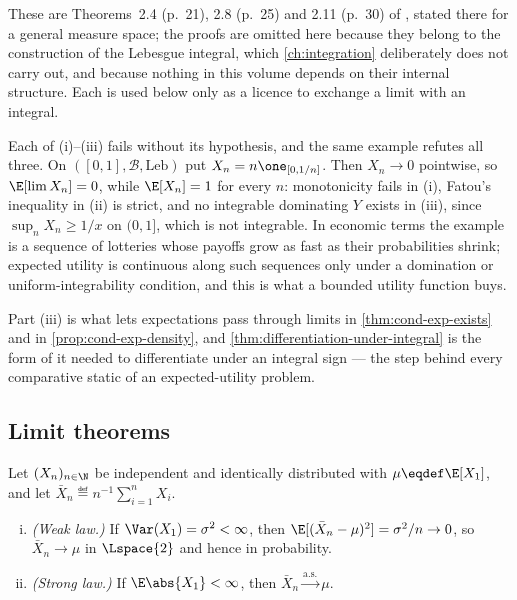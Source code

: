 These are Theorems~2.4 (p.~21), 2.8 (p.~25) and 2.11 (p.~30) of
\textcite{legall2022measure}, stated there for a general measure space; the proofs
are omitted here because they belong to the construction of the Lebesgue
integral, which \autoref{ch:integration} deliberately does not carry out, and
because nothing in this volume depends on their internal structure. Each is used
below only as a licence to exchange a limit with an integral.

\begin{remark}\label{rem:convergence-hypotheses}
	Each of (i)--(iii) fails without its hypothesis, and the same example refutes
	all three. On $([0,1],\mathcal{B},\text{Leb})$ put $X_n=n\one_{[0,1/n]}$. Then
	$X_n\to0$ pointwise, so $\E[\lim X_n]=0$, while $\E[X_n]=1$ for every $n$:
	monotonicity fails in (i), Fatou's inequality in (ii) is strict, and no
	integrable dominating $Y$ exists in (iii), since $\sup_nX_n\geq1/x$ on
	$(0,1]$, which is not integrable. In economic terms the example is a sequence
	of lotteries whose payoffs grow as fast as their probabilities shrink; expected
	utility is continuous along such sequences only under a domination or
	uniform-integrability condition, and this is what a bounded utility function
	buys.

	Part (iii) is what lets expectations pass through limits in
	\autoref{thm:cond-exp-exists} and in \autoref{prop:cond-exp-density}, and
	\autoref{thm:differentiation-under-integral} is the form of it needed to
	differentiate under an integral sign --- the step behind every comparative
	static of an expected-utility problem.
\end{remark}

\subsection{Limit theorems}\label{subsec:prob-limit-theorems}

\begin{theorem}\label{thm:lln}
	Let $(X_n)_{n\in\N}$ be independent and identically distributed with
	$\mu\eqdef\E[X_1]$, and let $\bar X_n\eqdef n^{-1}\sum_{i=1}^{n}X_i$.
	\begin{enumerate}[(i)]
		\item \emph{(Weak law.)} If $\Var(X_1)=\sigma^{2}<\infty$, then
		      $\E[(\bar X_n-\mu)^{2}]=\sigma^{2}/n\to0$, so
		      $\bar X_n\to\mu$ in $\Lspace{2}$ and hence in probability.
		\item \emph{(Strong law.)} If $\E\abs{X_1}<\infty$, then
		      $\bar X_n\overset{\text{a.s.}}{\to}\mu$.
	\end{enumerate}
\end{theorem}

